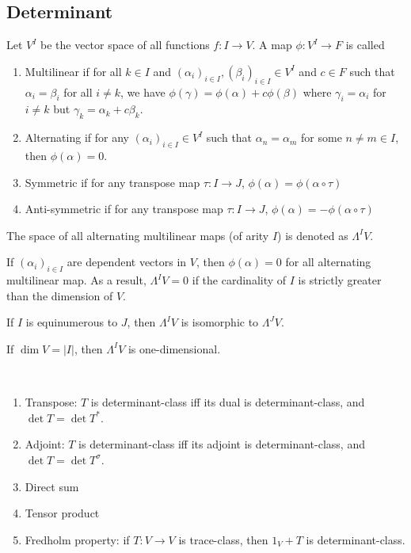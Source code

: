 \documentclass{treatise}
\begin{document}
\begin{shaded}
\subsection{Determinant}
Let $V^I$ be the vector space of all functions $f: I \to V$. A map $\phi: V^I \to F$ is called
\begin{enumerate}
	\item Multilinear if for all $k \in I$ and $(\alpha_i)_{i \in I}, (\beta_i)_{i \in I} \in V^I$ and $c \in F$ such that $\alpha_i = \beta_i$ for all $i \neq k$, we have $\phi(\gamma) = \phi(\alpha) + c \phi(\beta)$ where $\gamma_i = \alpha_i$ for $i \neq k$ but $\gamma_k = \alpha_k + c \beta_k$.
	\item Alternating if for any $(\alpha_i)_{i \in I} \in V^I$ such that $\alpha_n = \alpha_m$ for some $n \neq m \in I$, then $\phi(\alpha) = 0$.
	\item Symmetric if for any transpose map $\tau: I \to J$, $\phi(\alpha) = \phi(\alpha \circ \tau)$
	\item Anti-symmetric if for any transpose map $\tau: I \to J$, $\phi(\alpha) = -\phi(\alpha \circ \tau)$
\end{enumerate}
The space of all alternating multilinear maps (of arity $I$) is denoted as $\Lambda^I V$.
\begin{proposition}
If $(\alpha_i)_{i \in I}$ are dependent vectors in $V$, then $\phi(\alpha) = 0$ for all alternating multilinear map. As a result, $\Lambda^I V = 0$ if the cardinality of $I$ is strictly greater than the dimension of $V$.
\end{proposition}
\begin{proposition}
If $I$ is equinumerous to $J$, then $\Lambda^I V$ is isomorphic to $\Lambda^J V$.
\end{proposition}
\begin{theorem}
If $\dim V = |I|$, then $\Lambda^I V$ is one-dimensional.
\end{theorem}
\begin{theorem} \ 
\begin{enumerate}
	\item Transpose: $T$ is determinant-class iff its dual is determinant-class, and $\det T = \det T^*$.
	\item Adjoint: $T$ is determinant-class iff its adjoint is determinant-class, and $\det T = \det T^\sigma$.
	\item Direct sum
	\item Tensor product
	\item Fredholm property: if $T: V \to V$ is trace-class, then $1_V + T$ is determinant-class.

\end{enumerate}
\end{theorem}
\end{shaded}
\end{document}
